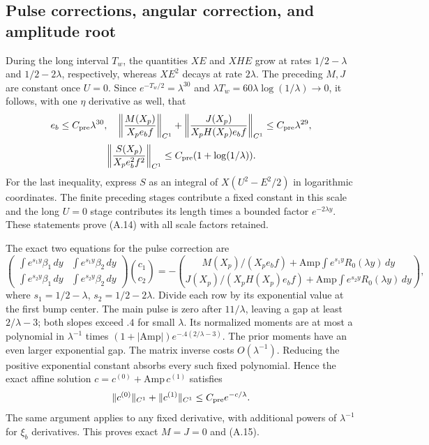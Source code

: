 \documentclass[10pt,a4paper]{article}
\begin{document}
\subsection{Pulse corrections, angular correction, and amplitude root}
During the long interval $T_w$, the quantities $XE$ and $XHE$ grow at rates
$1/2-\lambda$ and $1/2-2\lambda$, respectively, whereas $XE^2$ decays
at rate $2\lambda$. The preceding $M,J$ are constant once $U=0$.
Since $e^{-T_w/2}=\lambda^{30}$ and
$\lambda T_w=60\lambda\log(1/\lambda)\to0$, it follows, with one
$\eta$ derivative as well, that
\[
e_b\le C_{\rm pre}\lambda^{30},\quad
\left\|\frac{M(X_p)}{X_pe_bf}\right\|_{C^1}
+\left\|\frac{J(X_p)}{X_pH(X_p)e_bf}\right\|_{C^1}
\le C_{\rm pre}\lambda^{29},
\]
\[
\left\|\frac{S(X_p)}{X_pe_b^2f^2}\right\|_{C^1}
\le C_{\rm pre}(1+\log(1/\lambda)).
\]
For the last inequality, express $S$ as an integral of $X(U^2-E^2/2)$
in logarithmic coordinates. The finite preceding stages contribute a fixed
constant in this scale and the long $U=0$ stage contributes its length times
a bounded factor $e^{-2\lambda y}$. These statements prove (A.14) with all
scale factors retained.

The exact two equations for the pulse correction are
\[
\begin{pmatrix}
\int e^{s_1y}\beta_1\,dy&\int e^{s_1y}\beta_2\,dy\\
\int e^{s_2y}\beta_1\,dy&\int e^{s_2y}\beta_2\,dy
\end{pmatrix}\binom{c_1}{c_2}
=-\binom{M(X_p)/(X_pe_bf)+\mathrm{Amp}\int e^{s_1y}R_0(\lambda y)\,dy}
{J(X_p)/(X_pH(X_p)e_bf)+\mathrm{Amp}\int e^{s_2y}R_0(\lambda y)\,dy},
\]
where $s_1=1/2-\lambda$, $s_2=1/2-2\lambda$. Divide each row by its
exponential value at the first bump center. The main pulse is zero after
$11/\lambda$, leaving a gap at least $2/\lambda-3$; both slopes exceed $.4$
for small $\lambda$. Its normalized moments are at most a polynomial in
$\lambda^{-1}$ times $(1+|\mathrm{Amp}|)e^{-.4(2/\lambda-3)}$.
The prior moments have an even larger exponential gap. The matrix inverse costs
$O(\lambda^{-1})$. Reducing the positive exponential constant absorbs every
such fixed polynomial. Hence the exact affine solution
$c=c^{(0)}+\mathrm{Amp}\,c^{(1)}$ satisfies
\[
\|c^{(0)}\|_{C^1}+\|c^{(1)}\|_{C^1}\le C_{\rm pre}e^{-c/\lambda}.
\]
The same argument applies to any fixed derivative, with additional powers of
$\lambda^{-1}$ for $\xi_b$ derivatives. This proves exact $M=J=0$ and (A.15).
\end{document}
